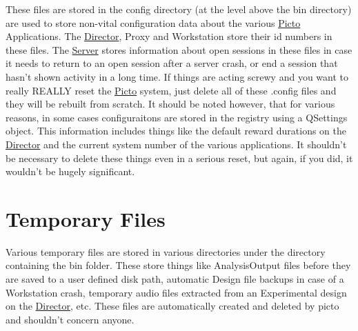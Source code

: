These files are stored in the config directory (at the level above the bin directory) are used to store non-\/vital configuration data about the various \hyperlink{namespace_picto}{Picto} Applications. The \hyperlink{class_director}{Director}, Proxy and Workstation store their id numbers in these files. The \hyperlink{class_server}{Server} stores information about open sessions in these files in case it needs to return to an open session after a server crash, or end a session that hasn't shown activity in a long time. If things are acting screwy and you want to really R\-E\-A\-L\-L\-Y reset the \hyperlink{namespace_picto}{Picto} system, just delete all of these .config files and they will be rebuilt from scratch. It should be noted however, that for various reasons, in some cases configuraitons are stored in the registry using a Q\-Settings object. This information includes things like the default reward durations on the \hyperlink{class_director}{Director} and the current system number of the various applications. It shouldn't be necessary to delete these things even in a serious reset, but again, if you did, it wouldn't be hugely significant. \hypertarget{user_files_temp_files}{}\section{Temporary Files}\label{user_files_temp_files}
Various temporary files are stored in various directories under the directory containing the bin folder. These store things like Analysis\-Output files before they are saved to a user defined disk path, automatic Design file backups in case of a Workstation crash, temporary audio files extracted from an Experimental design on the \hyperlink{class_director}{Director}, etc. These files are automatically created and deleted by picto and shouldn't concern anyone. 